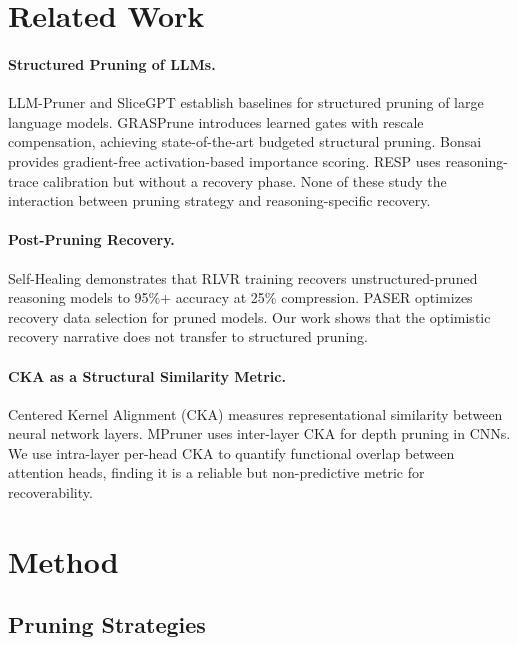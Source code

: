 \documentclass[11pt,a4paper]{article}
\begin{document}
\section{Related Work}
\label{sec:related}

\paragraph{Structured Pruning of LLMs.}
LLM-Pruner \cite{llmpruner2023} and SliceGPT \cite{slicegpt2024} establish baselines for structured pruning of large language models.
GRASPrune \cite{graspune2026} introduces learned gates with rescale compensation, achieving state-of-the-art budgeted structural pruning.
Bonsai \cite{bonsai2025} provides gradient-free activation-based importance scoring.
RESP \cite{resp2025} uses reasoning-trace calibration but without a recovery phase.
None of these study the interaction between pruning strategy and reasoning-specific recovery.

\paragraph{Post-Pruning Recovery.}
Self-Healing \cite{selfhealing2025} demonstrates that RLVR training recovers unstructured-pruned reasoning models to 95\%+ accuracy at 25\% compression.
PASER \cite{paser2025} optimizes recovery data selection for pruned models.
Our work shows that the optimistic recovery narrative does not transfer to structured pruning.

\paragraph{CKA as a Structural Similarity Metric.}
Centered Kernel Alignment (CKA) \cite{kornblith2019similarity} measures representational similarity between neural network layers.
MPruner \cite{mpruner2024} uses inter-layer CKA for depth pruning in CNNs.
We use intra-layer per-head CKA to quantify functional overlap between attention heads, finding it is a reliable but non-predictive metric for recoverability.

\section{Method}
\label{sec:method}

\subsection{Pruning Strategies}
\label{sec:pruning}
\end{document}
